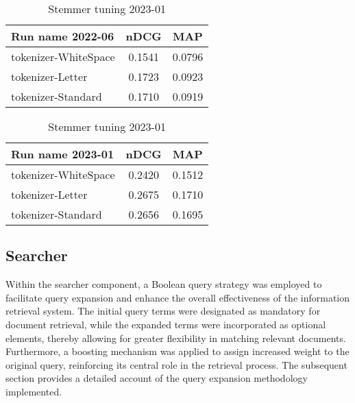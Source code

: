 \begin{table}[ht]
    \centering
    \begin{minipage}{0.48\textwidth}
        \centering
        \begin{tabular}{ |l|c|c| }
            \hline
            Run name 2022-06 & nDCG & MAP \\ [0.5ex]
            \hline\hline
            tokenizer-WhiteSpace & 0.1541 & 0.0796 \\
            \rowcolor{LightYellow}
            tokenizer-Letter & 0.1723 & 0.0923 \\
            tokenizer-Standard & 0.1710 & 0.0919 \\
            \hline
        \end{tabular}
        \caption{Stemmer tuning 2022-06}
        \label{tab:stemmer-a}
    \end{minipage}
    \hfill
    \begin{minipage}{0.48\textwidth}
        \centering
        \begin{tabular}{ |l|c|c| }
            \hline
            Run name 2023-01 & nDCG & MAP \\ [0.5ex]
            \hline\hline
            tokenizer-WhiteSpace & 0.2420 & 0.1512 \\
            \rowcolor{LightYellow}
            tokenizer-Letter & 0.2675 & 0.1710 \\
            tokenizer-Standard & 0.2656 & 0.1695 \\
            \hline
        \end{tabular}
        \caption{Stemmer tuning 2023-01}
        \label{tab:stemmer-b}
    \end{minipage}
\end{table}


\subsection{Searcher}
\label{subsec:searcher}
Within the searcher component, a Boolean query strategy was employed to facilitate query expansion and enhance the overall effectiveness of the information retrieval system. The initial query terms were designated as mandatory for document retrieval, while the expanded terms were incorporated as optional elements, thereby allowing for greater flexibility in matching relevant documents. Furthermore, a boosting mechanism was applied to assign increased weight to the original query, reinforcing its central role in the retrieval process. The subsequent section provides a detailed account of the query expansion methodology implemented.

